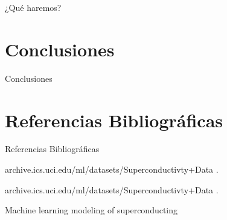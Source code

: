 \documentclass[11pt]{beamer}\usepackage{knitr}
\begin{document}
\begin{frame}[fragile]{¿Qué haremos?}

\end{frame}


\section{Conclusiones}

\begin{frame}[fragile]{Conclusiones}

\end{frame}


\section{Referencias Bibliográficas}

\begin{frame}[fragile]{Referencias Bibliográficas}

\begin{thebibliography}{10}

	\beamertemplateonlinebibitems %
	archive.ics.uci.edu/ml/datasets/Superconductivty+Data
	.

	\beamertemplateonlinebibitems %
	archive.ics.uci.edu/ml/datasets/Superconductivty+Data
	.

	\beamertemplatearticlebibitems %
	Machine learning modeling of superconducting


\end{thebibliography}
\end{frame}
\end{document}
